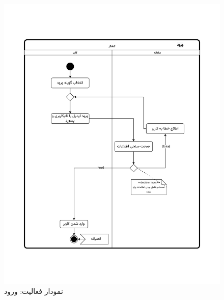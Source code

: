 \begin{figure}[ht!]
	\centering
	\includegraphics[scale=0.8, page=1]{figs/OOD-activity-login.pdf}
	\caption{نمودار فعالیت: ورود}
\end{figure}
\FloatBarrier
\newpage

